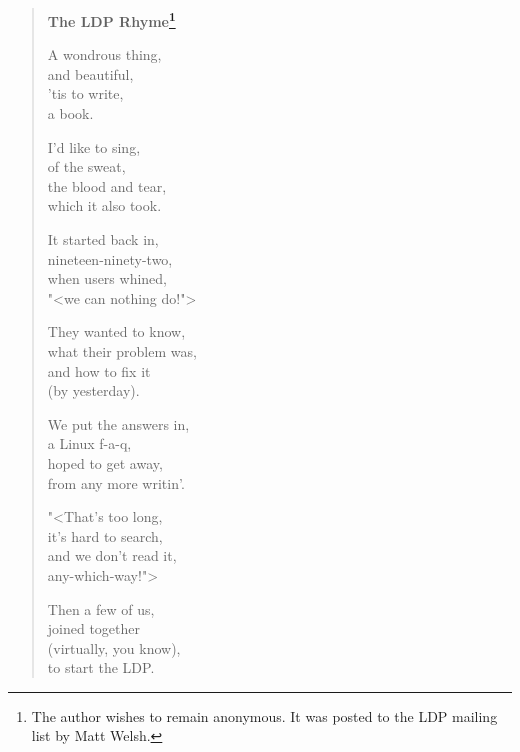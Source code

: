 
	  
	{
	\footnotesize
	\begin{verse}
		{\bf \normalsize The LDP Rhyme\footnote{The author
		wishes to remain anonymous.  It was posted to the
		LDP mailing list by Matt Welsh.}} \\
		\bigskip

		A wondrous thing, \\
		and beautiful, \\
		'tis to write, \\
		a book. \\
		\bigskip

		I'd like to sing, \\
		of the sweat, \\
		the blood and tear, \\
		which it also took. \\
		\bigskip

		It started back in, \\
		nineteen-ninety-two, \\
		when users whined, \\
		"<we can nothing do!"> \\
		\bigskip

		They wanted to know, \\
		what their problem was, \\
		and how to fix it \\
		(by yesterday). \\
		\bigskip

		We put the answers in, \\
		a Linux f-a-q, \\
		hoped to get away, \\
		from any more writin'. \\
		\bigskip

		"<That's too long, \\
		it's hard to search, \\
		and we don't read it, \\
		any-which-way!"> \\
		\bigskip

		Then a few of us, \\
		joined together \\
		(virtually, you know), \\
		to start the LDP. \\


\end{verse}}

